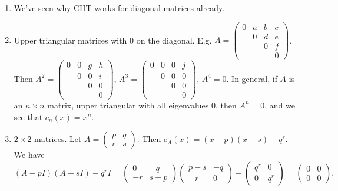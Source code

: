 \documentclass{article}
\theoremstyle{definition} \newtheorem*{definition}{Definition}
\begin{document}
\begin{exmps}
 \hfill
 \begin{enumerate}
   \item We've seen why CHT works for diagonal matrices already.
   \item Upper triangular matrices with 0 on the diagonal.
     E.g. $A=\left( 
     \begin{matrix}
       0 & a & b & c \\
        & 0 & d & e \\
         & & 0 & f \\
          & & & 0
     \end{matrix}
     \right)$. Then $A^2 = \left( 
          \begin{matrix}
                   0 & 0 & g & h \\
                           & 0 & 0 & i \\
                                    & & 0 & 0 \\
                                              & & & 0
                                                   \end{matrix}
                                                        \right)$,
    $A^3 = \left( 
\begin{matrix}
  0 & 0 & 0 & j \\
  & 0 & 0 & 0 \\
  & & 0 & 0 \\
  & & & 0
\end{matrix}
    \right)$, $A^4 =0$. In general, if $A$ is an $n \times n$ matrix, 
    upper triangular with all eigenvalues 0, then $A^n = 0$, and we
    see that $c_n(x) = x^n$.
  \item $2 \times 2$ matrices. Let $A = \left( 
    \begin{matrix}
      p & q \\
      r & s
    \end{matrix}
    \right)$. Then $c_A(x) = (x-p)(x-s)-q^r$. We have 
    $(A-pI)(A-sI)-q^rI = \left( 
\begin{matrix}
  0 & -q \\
  -r & s-p
\end{matrix}
    \right)\left( 
    \begin{matrix}
      p-s & -q \\
      -r & 0
    \end{matrix}
    \right) - \left( 
\begin{matrix}
  q^r & 0 \\
  0 & q^r
\end{matrix}
    \right) = \left( 
    \begin{matrix}
      0 & 0 \\
      0 & 0
    \end{matrix}
    \right).$
 \end{enumerate}
\end{exmps}
\end{document}
